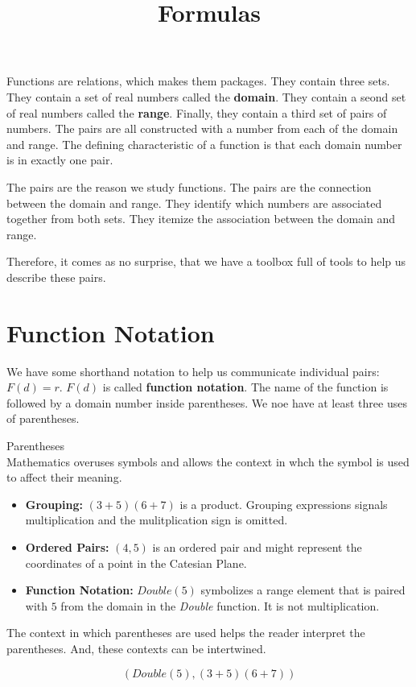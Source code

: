 \documentclass{ximera}
\title{Formulas}
\begin{document}
\begin{abstract}

\end{abstract}
\maketitle


Functions are relations, which makes them packages.  They contain three sets.  They contain a set of real numbers called the \textbf{domain}.  They contain a seond set of real numbers called the \textbf{range}. Finally, they contain a third set of pairs of numbers.  The pairs are all constructed with a number from each of the domain and range. The defining characteristic of a function is that each domain number is in exactly one pair.

The pairs are the reason we study functions.  The pairs are the connection between the domain and range.  They identify which numbers are associated together from both sets. They itemize the association between the domain and range.

Therefore, it comes as no surprise, that we have a toolbox full of tools to help us describe these pairs.


\section{Function Notation}

We have some shorthand notation to help us communicate individual pairs: $F(d) = r$.  $F(d)$ is called \textbf{function notation}. The name of the function is followed by a domain number inside parentheses. We noe have at least three uses of parentheses.

\begin{notation}  Parentheses \\

Mathematics overuses symbols and allows the context in whch the symbol is used to affect their meaning.
	\begin{itemize}
		\item \textbf{Grouping:} $(3+5)(6+7)$ is a product.  Grouping expressions signals multiplication and the mulitplication sign is omitted.
		\item \textbf{Ordered Pairs:} $(4, 5)$ is an ordered pair and might represent the coordinates of a point in the Catesian Plane.
		\item \textbf{Function Notation:} $Double(5)$ symbolizes a range element that is paired with $5$ from the domain in the \textit{Double} function. It is not multiplication.
	\end{itemize}


The context in which parentheses are used helps the reader interpret the parentheses.  And, these contexts can be intertwined.

\[  (Double(5), (3+5)(6+7))    \]
\end{notation}
\end{document}
